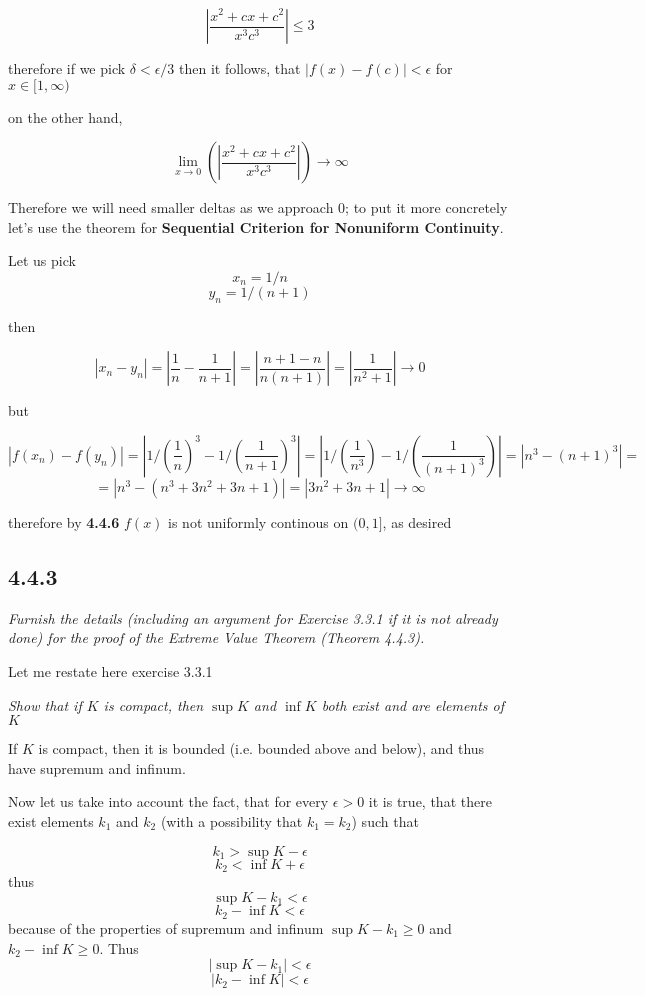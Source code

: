 \documentclass[11pt,oneside,titlepage]{book}
\begin{document}
$$ |\frac{x^2 + cx + c^2}{x^3c^3}| \leq 3 $$

therefore if we pick $\delta < \epsilon / 3 $ then it follows, that
$|f(x) - f(c)| < \epsilon$ for $x \in [1, \infty)$

on the other hand,

$$ \lim_{x \to 0}(|\frac{x^2 + cx + c^2}{x^3c^3}|) \to \infty  $$

Therefore we will need smaller deltas as we approach 0; to put it more
concretely let's use the theorem for
\textbf{Sequential Criterion for Nonuniform Continuity}.

Let us pick
$$x_n = 1/n$$
$$y_n = 1/(n + 1)$$

then

$$|x_n - y_n| = |\frac{1}{n} - \frac{1}{n + 1}| = |\frac{n + 1 - n}{n(n + 1)}|
= |\frac{1}{n ^ 2 + 1}| \to 0$$

but

$$ |f(x_n) - f(y_n)| = |1/(\frac{1}{n})^3 - 1/(\frac{1}{n + 1})^3| = |1/(\frac{1}{n^3}) - 1/(\frac{1}{(n + 1)^3})| =  |n^3 - (n + 1)^3| =  $$
$$ = |n^3 - (n ^ 3 + 3 n^2 + 3 n + 1)| = |3n^2 + 3n + 1| \to \infty$$

therefore by \textbf{4.4.6} $f(x)$ is not uniformly continous on $(0, 1]$, as desired

\subsection*{4.4.3}
\textit{Furnish the details (including an argument for Exercise 3.3.1 if it is not already done) for the proof of the Extreme Value Theorem (Theorem 4.4.3).}

Let me restate here exercise 3.3.1

\textit{Show that if $K$ is compact, then $\sup K$ and $\inf K$ both exist
  and are elements of $K$}

If $K$ is compact, then it is bounded (i.e. bounded above and below), and
thus have supremum and infinum.

Now let us take into account the fact, that for every $\epsilon > 0$ it is
true, that there exist elements $k_1$ and $k_2$ (with a possibility
that $k_1 = k_2$) such that

$$k_1 > \sup K - \epsilon$$
$$k_2 < \inf K + \epsilon$$
thus
$$\sup K - k_1 <  \epsilon$$
$$k_2 - \inf K < \epsilon$$
because of the properties of supremum and infinum $\sup K - k_1 \geq  0$ and
$k_2 - \inf K \geq 0$. Thus
$$|\sup K - k_1| < \epsilon$$
$$|k_2 - \inf K| < \epsilon$$
\end{document}

